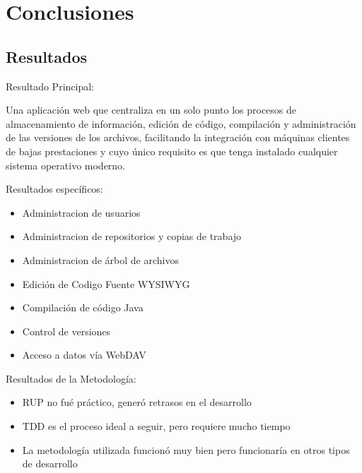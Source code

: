 \section{Conclusiones}

\subsection{Resultados}

\begin{frame}{Resultado Principal:\newline}

Una aplicación web que centraliza en un solo punto los procesos de almacenamiento de información, edición de código, compilación y administración de las versiones de los archivos, facilitando la integración con máquinas clientes de bajas prestaciones y cuyo único requisito es que tenga instalado cualquier sistema operativo moderno.

\end{frame}

\begin{frame}{Resultados específicos:\newline}

\begin{itemize}
	
	\item Administracion de usuarios
	\item Administracion de repositorios y copias de trabajo
	\item Administracion de árbol de archivos
	\item Edición de Codigo Fuente WYSIWYG
	\item Compilación de código Java
	\item Control de versiones
	\item Acceso a datos vía WebDAV
	
\end{itemize}

\end{frame}


\begin{frame}{Resultados de la Metodología:\newline}

\begin{itemize}
	
	\item RUP no fué práctico, generó retrasos en el desarrollo
	\pause
	
	\item TDD es el proceso ideal a seguir, pero requiere mucho tiempo
	\pause	
	
	\item La metodología utilizada funcionó muy bien pero funcionaría en otros tipos de desarrollo
	
\end{itemize}

\end{frame}


